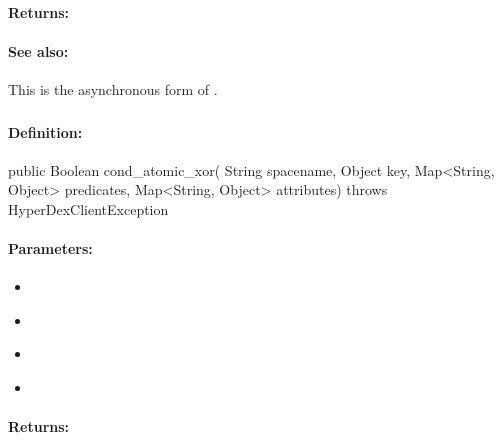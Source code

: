 \paragraph{Returns:}


\paragraph{See also:}  This is the asynchronous form of .

\pagebreak
\subsubsection{}
\label{api:java:cond_atomic_xor}


\paragraph{Definition:}
\begin{javacode}
public Boolean cond_atomic_xor(
        String spacename,
        Object key,
        Map<String, Object> predicates,
        Map<String, Object> attributes) throws HyperDexClientException
\end{javacode}

\paragraph{Parameters:}
\begin{itemize}[noitemsep]
\item {}\\

\item {}\\

\item {}\\

\item {}\\

\end{itemize}

\paragraph{Returns:}


